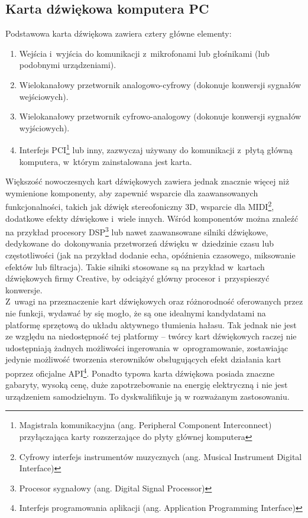 \subsection{Karta dźwiękowa komputera PC}
\label{soundcard}
Podstawowa karta dźwiękowa zawiera cztery główne elementy:
\begin{enumerate}
	\item Wejścia i~wyjścia do komunikacji z~mikrofonami lub głośnikami (lub podobnymi urządzeniami).
	\item Wielokanałowy przetwornik analogowo-cyfrowy (dokonuje konwersji sygnałów wejściowych).
	\item Wielokanałowy przetwornik cyfrowo-analogowy (dokonuje konwersji sygnałów wyjściowych).
	\item Interfejs PCI\footnote{Magistrala komunikacyjna (ang. Peripheral Component Interconnect) przyłączająca karty rozszerzające do płyty głównej komputera} lub inny, zazwyczaj używany do komunikacji z~płytą główną komputera, w~którym zainstalowana jest karta.
\end{enumerate}
Większość nowoczesnych kart dźwiękowych zawiera jednak znacznie więcej niż wymienione komponenty, aby zapewnić wsparcie dla zaawansowanych funkcjonalności, takich jak dźwięk stereofoniczny 3D, wsparcie dla MIDI\footnote{Cyfrowy interfejs instrumentów muzycznych (ang. Musical Instrument Digital Interface)}, dodatkowe efekty dźwiękowe i~wiele innych. Wśród komponentów można znaleźć na przykład procesory DSP\footnote{Procesor sygnałowy (ang. Digital Signal Processor)} lub nawet zaawansowane silniki dźwiękowe, dedykowane do~dokonywania przetworzeń dźwięku w~dziedzinie czasu lub częstotliwości (jak na przykład dodanie echa, opóźnienia czasowego, miksowanie efektów lub filtracja). Takie silniki stosowane są na przykład w~kartach dźwiękowych firmy Creative, by odciążyć główny procesor i~przyspieszyć konwersje.\\
Z~uwagi na przeznaczenie kart dźwiękowych oraz różnorodność oferowanych przez nie funkcji, wydawać by się mogło, że są one idealnymi kandydatami na platformę sprzętową do układu aktywnego tłumienia hałasu. Tak jednak nie jest ze względu na niedostępność tej platformy -- twórcy kart dźwiękowych raczej nie udostępniają żadnych możliwości ingerowania w~oprogramowanie, zostawiając jedynie możliwość tworzenia sterowników obsługujących efekt działania kart poprzez oficjalne API\footnote{Interfejs programowania aplikacji (ang. Application Programming Interface)}. Ponadto typowa karta dźwiękowa posiada znaczne gabaryty, wysoką cenę, duże zapotrzebowanie na energię elektryczną i nie jest urządzeniem samodzielnym. To dyskwalifikuje ją w rozważanym zastosowaniu.
